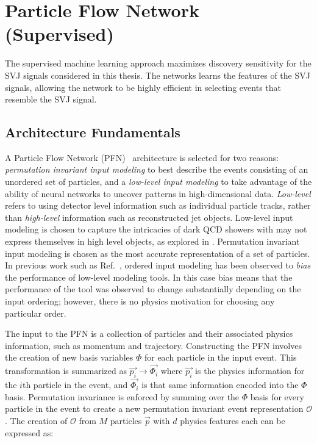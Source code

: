 \section{Particle Flow Network (Supervised)}
\label{subsec:supervised}
The supervised machine learning approach maximizes discovery sensitivity for the SVJ signals considered in this thesis.
The networks learns the features of the SVJ signals, allowing the network to be highly efficient in selecting events that resemble the SVJ signal.

\subsection{Architecture Fundamentals}

A Particle Flow Network (PFN)~\cite{pfn} architecture is selected for two reasons: \textit{permutation invariant input modeling} to best describe the events consisting of an unordered set of particles, and a \textit{low-level input modeling} to take advantage of the ability of neural networks to uncover patterns in high-dimensional data. \textit{Low-level} refers to using detector level information such as individual particle tracks, rather than \textit{high-level} information such as reconstructed jet objects. Low-level input modeling is chosen to capture the intricacies of dark QCD showers with may not express themselves in high level objects, as explored in \cite{darkqcd}. Permutation invariant input modeling is chosen as the most accurate representation of a set of particles. In previous work such as Ref.~\cite{vrnn}, ordered input modeling has been observed to \textit{bias} the performance of low-level modeling tools. In this case bias means that the performance of the tool was observed to change substantially depending on the input ordering; however, there is no physics motivation for choosing any particular order. 

The input to the PFN is a collection of particles and their associated physics information, such as momentum and trajectory. Constructing the PFN involves the creation of new basis variables $\Phi$ for each particle in the input event. This transformation is summarized as $\vec{p_i} \rightarrow \vec{\Phi_i}$ where $\vec{p_i}$ is the physics information for the $i$th particle in the event, and $\vec{\Phi_i}$ is that same information encoded into the $\Phi$ basis. Permutation invariance is enforced by summing over the $\Phi$ basis for every particle in the event to create a new permutation invariant event representation $\mathcal{O}$. The creation of $\mathcal{O}$ from $M$ particles $\vec{p}$ with $d$ physics features each can be expressed as:

